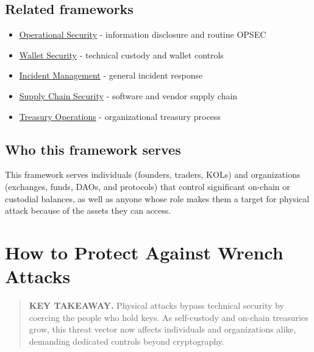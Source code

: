 \section{Related frameworks}\label{related-frameworks}

\begin{itemize}
\tightlist
\item
  \href{https://frameworks.securityalliance.dev/opsec/overview}{Operational Security} - information disclosure and routine OPSEC
\item
  \href{https://frameworks.securityalliance.dev/wallet-security/overview}{Wallet Security} - technical custody and wallet controls
\item
  \href{https://frameworks.securityalliance.dev/incident-management/overview}{Incident Management} - general incident response
\item
  \href{https://frameworks.securityalliance.dev/supply-chain/overview}{Supply Chain Security} - software and vendor supply chain
\item
  \href{https://frameworks.securityalliance.dev/treasury-operations/overview}{Treasury Operations} - organizational treasury process
\end{itemize}

\section{Who this framework serves}\label{who-this-framework-serves}

This framework serves individuals (founders, traders, KOLs) and organizations (exchanges, funds, DAOs, and protocols) that control significant on-chain or custodial balances, as well as anyone whose role makes them a target for physical attack because of the assets they can access.

\chapter{How to Protect Against Wrench Attacks}\label{how-to-protect-against-wrench-attacks}

\begin{quote}
\textbf{KEY TAKEAWAY.} Physical attacks bypass technical security by coercing the people who hold keys. As self-custody and on-chain treasuries grow, this threat vector now affects individuals and organizations alike, demanding dedicated controls beyond cryptography.
\end{quote}

